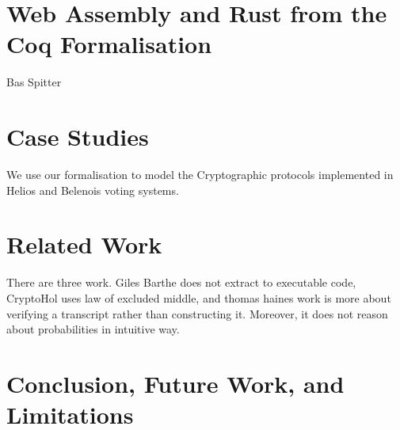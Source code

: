 \documentclass[sigconf]{acmart}
\begin{document}
\section{Web Assembly and Rust from the Coq Formalisation}
  Bas Spitter


\section{Case Studies}
  We use our formalisation to model the Cryptographic protocols implemented in 
  Helios and Belenois voting systems. 


\section{Related Work}
  There are three work. Giles Barthe does not extract to executable code, 
  CryptoHol uses law of excluded middle, and thomas haines work is more about 
  verifying a transcript rather than constructing it. Moreover, 
  it does not reason about probabilities in intuitive way. 

\section{Conclusion, Future Work, and Limitations}









\end{document}
